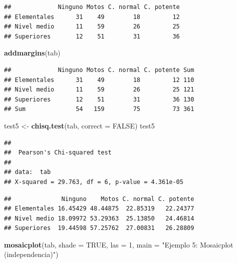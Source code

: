 \documentclass[
]{article}
\newenvironment{Shaded}{\begin{snugshade}}{\end{snugshade}}
\newcommand{\AttributeTok}[1]{\textcolor[rgb]{0.13,0.29,0.53}{#1}}
\newcommand{\ConstantTok}[1]{\textcolor[rgb]{0.56,0.35,0.01}{#1}}
\newcommand{\DecValTok}[1]{\textcolor[rgb]{0.00,0.00,0.81}{#1}}
\newcommand{\FunctionTok}[1]{\textcolor[rgb]{0.13,0.29,0.53}{\textbf{#1}}}
\newcommand{\NormalTok}[1]{#1}
\newcommand{\OtherTok}[1]{\textcolor[rgb]{0.56,0.35,0.01}{#1}}
\newcommand{\SpecialCharTok}[1]{\textcolor[rgb]{0.81,0.36,0.00}{\textbf{#1}}}
\newcommand{\StringTok}[1]{\textcolor[rgb]{0.31,0.60,0.02}{#1}}
\begin{document}
\begin{verbatim}
##             Ninguno Motos C. normal C. potente
## Elementales      31    49        18         12
## Nivel medio      11    59        26         25
## Superiores       12    51        31         36
\end{verbatim}

\begin{Shaded}
\begin{Highlighting}[]
\FunctionTok{addmargins}\NormalTok{(tab)}
\end{Highlighting}
\end{Shaded}

\begin{verbatim}
##             Ninguno Motos C. normal C. potente Sum
## Elementales      31    49        18         12 110
## Nivel medio      11    59        26         25 121
## Superiores       12    51        31         36 130
## Sum              54   159        75         73 361
\end{verbatim}

\begin{Shaded}
\begin{Highlighting}[]
\NormalTok{test5 }\OtherTok{\textless{}{-}} \FunctionTok{chisq.test}\NormalTok{(tab, }\AttributeTok{correct =} \ConstantTok{FALSE}\NormalTok{)}
\NormalTok{test5}
\end{Highlighting}
\end{Shaded}

\begin{verbatim}
## 
##  Pearson's Chi-squared test
## 
## data:  tab
## X-squared = 29.763, df = 6, p-value = 4.361e-05
\end{verbatim}

\begin{Shaded}
\end{Shaded}

\begin{verbatim}
##              Ninguno    Motos C. normal C. potente
## Elementales 16.45429 48.44875  22.85319   22.24377
## Nivel medio 18.09972 53.29363  25.13850   24.46814
## Superiores  19.44598 57.25762  27.00831   26.28809
\end{verbatim}

\begin{Shaded}
\begin{Highlighting}[]
\FunctionTok{mosaicplot}\NormalTok{(tab, }\AttributeTok{shade =} \ConstantTok{TRUE}\NormalTok{, }\AttributeTok{las =} \DecValTok{1}\NormalTok{,}
           \AttributeTok{main =} \StringTok{"Ejemplo 5: Mosaicplot (independencia)"}\NormalTok{)}
\end{Highlighting}
\end{Shaded}
\end{document}
